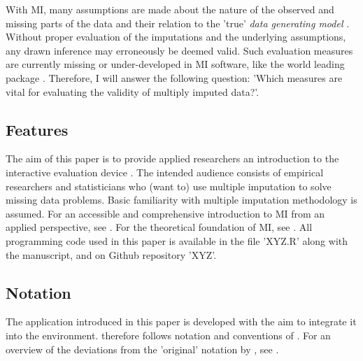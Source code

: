 \documentclass[article]{jss}
\begin{document}
With MI, many assumptions are made about the nature of the observed and missing parts of the data and their relation to the 'true' \emph{data generating model} \citep{buur18}. Without proper evaluation of the imputations and the underlying assumptions, any drawn inference may erroneously be deemed valid. Such evaluation measures are currently missing or under-developed in MI software, like the world leading  package  \citep{mice}. Therefore, I will answer the following question: 'Which measures are vital for evaluating the validity of multiply imputed data?'.

\subsection{Features} \label{sec:features}

The aim of this paper is to provide applied researchers an introduction to the interactive evaluation device . The intended audience consists of empirical researchers and statisticians who (want to) use multiple imputation to solve missing data problems. Basic familiarity with multiple imputation methodology is assumed. For an accessible and comprehensive introduction to MI from an applied perspective, see \cite{buur18}. For the theoretical foundation of MI, see \cite{rubin87}. All programming code used in this paper is available in the file 'XYZ.R' along with the manuscript, and on Github repository 'XYZ'. 



\subsection{Notation} \label{sec:notation}

The   application introduced in this paper is developed with the aim to integrate it into the  environment.  therefore follows notation and conventions of \cite{mice}. For an overview of the deviations from the 'original' notation by \cite{rubin87}, see \cite{buur18}. 
\end{document}
